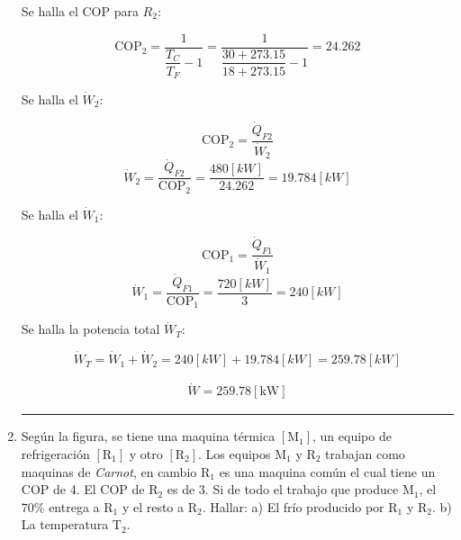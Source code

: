 \documentclass[letter,10pt]{article}
\begin{document}
\begin{enumerate}
Se halla el COP para $R_2$:

\begin{equation*}
    \text{COP}_2 = \dfrac{1}{\dfrac{T_C}{T_F} - 1}
          = \dfrac{1}{\dfrac{30+273.15}{18+273.15} - 1}
          = 24.262
\end{equation*}

Se halla el $\dot{W}_2$:

\begin{equation*}
    \text{COP}_2 = \frac{\dot{Q}_{F2}}{\dot{W}_2}
\end{equation*}
\begin{equation*}
    \dot{W}_2 = \frac{\dot{Q}_{F2}}{\text{COP}_2}
              = \frac{480[kW]}{24.262}
              = 19.784[kW]
\end{equation*}

Se halla el $\dot{W}_1$:

\begin{equation*}
    \text{COP}_1 = \frac{\dot{Q}_{F1}}{\dot{W}_1}
\end{equation*}
\begin{equation*}
    \dot{W}_1 = \frac{\dot{Q}_{F1}}{\text{COP}_1}
              = \frac{720[kW]}{3}
              = 240[kW]
\end{equation*}

Se halla la potencia total $\dot{W}_T$:

\begin{equation*}
    \dot{W}_T = \dot{W}_1 + \dot{W}_2
              = 240[kW] + 19.784[kW]
              = 259.78[kW]
\end{equation*}

\begin{equation*}
\boxed{
    \begin{array}{l}
        \dot{W} = 259.78[\text{kW}]
    \end{array}
}
\end{equation*}

\noindent\rule{15.2cm}{0.4pt}

\item Según la figura, se tiene una maquina térmica $[\text{M}_1]$, un equipo de
refrigeración $[\text{R}_1]$ y otro $[\text{R}_2]$. Los equipos $\text{M}_1$ y
$\text{R}_2$ trabajan como maquinas de \emph{Carnot}, en cambio $\text{R}_1$ es
una maquina común el cual tiene un COP de 4. El COP de $\text{R}_2$ es de 3. Si
de todo el trabajo que produce $\text{M}_1$, el $70\%$ entrega a $\text{R}_1$ y
el resto a $\text{R}_2$. Hallar: a) El frío producido por $\text{R}_1$ y
$\text{R}_2$. b) La temperatura $\text{T}_2$.


\end{enumerate}
\end{document}
